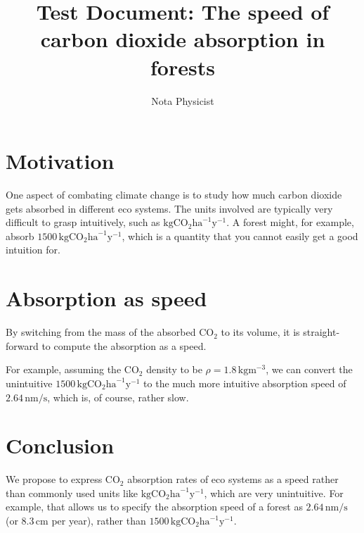 \documentclass{article}
\author{Nota Physicist}
\title{Test Document: The speed of carbon dioxide absorption in forests}
\begin{document}
\maketitle
\section{Motivation}
One aspect of combating climate change is to study how much carbon dioxide
gets absorbed in different eco systems.
The units involved are typically very difficult to grasp intuitively,
such as $\textrm{kg}\textrm{CO}_2\textrm{ha}^{-1}\textrm{y}^{-1}$.
A forest might, for example, absorb $1500\,\textrm{kg}\textrm{CO}_2\textrm{ha}^{-1}\textrm{y}^{-1}$,
which is a quantity that you cannot easily get a good intuition for.

\section{Absorption as speed}
By switching from the mass of the absorbed $\textrm{CO}_2$ to its volume,
it is straight-forward to compute the absorption as a speed.

For example, assuming the $\textrm{CO}_2$ density to be $\rho = 1.8\,\textrm{kg}\textrm{m}^{-3}$,
we can convert the unintuitive $1500\,\textrm{kg}\textrm{CO}_2\textrm{ha}^{-1}\textrm{y}^{-1}$
to the much more intuitive absorption speed of
$2.64\,\textrm{nm}/\textrm{s}$, which is, of course, rather slow.

\section{Conclusion}
We propose to express $\textrm{CO}_2$ absorption rates of eco systems as a speed
rather than commonly used units like $\textrm{kg}\textrm{CO}_2\textrm{ha}^{-1}\textrm{y}^{-1}$,
which are very unintuitive.
For example, that allows us to specify the absorption speed of a forest as
$2.64\,\textrm{nm}/\textrm{s}$ (or $8.3\,\textrm{cm}$ per year), rather than
$1500\,\textrm{kg}\textrm{CO}_2\textrm{ha}^{-1}\textrm{y}^{-1}$.
\end{document}
